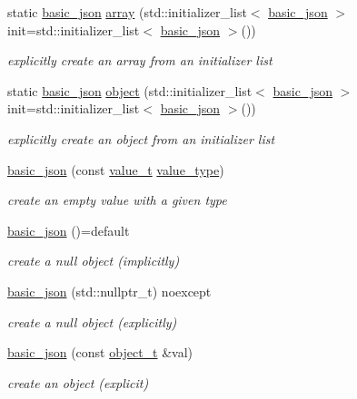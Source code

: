 \begin{DoxyCompactItemize}
\item 
static \hyperlink{a00025}{basic\+\_\+json} \hyperlink{a00025_a5685815624b086caa532f41e853d4b0f}{array} (std\+::initializer\+\_\+list$<$ \hyperlink{a00025}{basic\+\_\+json} $>$ init=std\+::initializer\+\_\+list$<$ \hyperlink{a00025}{basic\+\_\+json} $>$())
\begin{DoxyCompactList}\small\item\em explicitly create an array from an initializer list \end{DoxyCompactList}\item 
static \hyperlink{a00025}{basic\+\_\+json} \hyperlink{a00025_ad25b2f8c21e241e2d63455537a9294ff}{object} (std\+::initializer\+\_\+list$<$ \hyperlink{a00025}{basic\+\_\+json} $>$ init=std\+::initializer\+\_\+list$<$ \hyperlink{a00025}{basic\+\_\+json} $>$())
\begin{DoxyCompactList}\small\item\em explicitly create an object from an initializer list \end{DoxyCompactList}\item 
\hyperlink{a00025_a8f77085bd98c97a983d9ba12efbf6148}{basic\+\_\+json} (const \hyperlink{a00025_a231b02148577b69a154b2ce2c87a5522}{value\+\_\+t} \hyperlink{a00025_ac8d45b57874b4a6e9c07f7d3b5daa1f9}{value\+\_\+type})
\begin{DoxyCompactList}\small\item\em create an empty value with a given type \end{DoxyCompactList}\item 
\hyperlink{a00025_a53771a7a4f2787125e55f64448f24ce6}{basic\+\_\+json} ()=default
\begin{DoxyCompactList}\small\item\em create a null object (implicitly) \end{DoxyCompactList}\item 
\hyperlink{a00025_ade0e56c8c320d7f342e7a5697e6d6f7e}{basic\+\_\+json} (std\+::nullptr\+\_\+t) noexcept
\begin{DoxyCompactList}\small\item\em create a null object (explicitly) \end{DoxyCompactList}\item 
\hyperlink{a00025_a9af5ea68c88f423ddf35216aff7f1813}{basic\+\_\+json} (const \hyperlink{a00025_a0ac9894c9de8dc551cf2e5f1c605537f}{object\+\_\+t} \&val)
\begin{DoxyCompactList}\small\item\em create an object (explicit) \end{DoxyCompactList}\item 

\end{DoxyCompactItemize}
